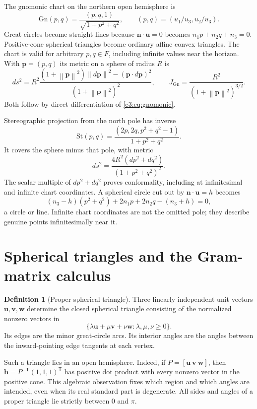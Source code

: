 \documentclass[11pt,letterpaper]{article}
\numberwithin{equation}{section}
\theoremstyle{definition}
\newtheorem{definition}[definition]{Definition}
\theoremstyle{remark}
\newcommand{\norm}[1]{\left\lVert#1\right\rVert}
\newcommand{\vv}[1]{\bm{#1}}
\newcommand{\transpose}{^{\mathsf T}}
\begin{document}
The gnomonic chart on the northern open hemisphere is
\begin{equation}\label{e3:eq:gnomonic}
 \mathrm{Gn}(p,q)=\frac{(p,q,1)}{\sqrt{1+p^2+q^2}},\qquad
 (p,q)=(u_1/u_3,u_2/u_3).
\end{equation}
Great circles become straight lines because $\vv n\cdot\vv u=0$ becomes
$n_1p+n_2q+n_3=0$. Positive-cone spherical triangles become ordinary affine
convex triangles. The chart is valid for arbitrary $p,q\in F$, including
infinite values near the horizon. With $\vv p=(p,q)$ its metric on a sphere
of radius $R$ is
\begin{equation}\label{e3:eq:gnomonicmetric}
 ds^2=R^2\frac{(1+\norm{\vv p}^2)\norm{d\vv p}^2
                 -(\vv p\cdot d\vv p)^2}
                 {(1+\norm{\vv p}^2)^2},
 \qquad J_{\mathrm{Gn}}=\frac{R^2}{(1+\norm{\vv p}^2)^{3/2}}.
\end{equation}
Both follow by direct differentiation of \cref{e3:eq:gnomonic}.

Stereographic projection from the north pole has inverse
\begin{equation}\label{e3:eq:stereo}
 \mathrm{St}(p,q)=\frac{(2p,2q,p^2+q^2-1)}{1+p^2+q^2}.
\end{equation}
It covers the sphere minus that pole, with metric
\[
 ds^2=\frac{4R^2(dp^2+dq^2)}{(1+p^2+q^2)^2}.
\]
The scalar multiple of $dp^2+dq^2$ proves conformality, including at
infinitesimal and infinite chart coordinates. A spherical circle cut out by
$\vv n\cdot\vv u=h$ becomes
\[
 (n_3-h)(p^2+q^2)+2n_1p+2n_2q-(n_3+h)=0,
\]
a circle or line. Infinite chart coordinates are not the omitted pole;
they describe genuine points infinitesimally near it.

\section{Spherical triangles and the Gram-matrix calculus}\label{e3:sec:spherical-laws}

\begin{definition}[Proper spherical triangle]
Three linearly independent unit vectors $\vv u,\vv v,\vv w$ determine the
closed spherical triangle consisting of the normalized nonzero vectors in
\[
 \{\lambda\vv u+\mu\vv v+\nu\vv w:\lambda,\mu,\nu\ge0\}.
\]
Its edges are the minor great-circle arcs. Its interior angles are the angles
between the inward-pointing edge tangents at each vertex.
\end{definition}

Such a triangle lies in an open hemisphere. Indeed, if
$P=[\vv u\ \vv v\ \vv w]$, then
$\vv h=P^{-\mathsf T}(1,1,1)\transpose$ has positive dot product with every
nonzero vector in the positive cone. This algebraic observation fixes which
region and which angles are intended, even when its real standard part is
degenerate. All sides and angles of a proper triangle lie strictly between
$0$ and $\pi$.
\end{document}
